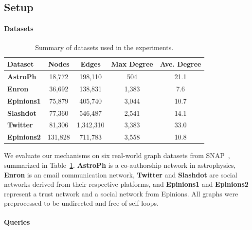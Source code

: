 \subsection{Setup}
\label{subsec:exp_setup}





\paragraph{Datasets}



\begin{table}[!htbp]
\centering
\small
\begin{tabular}{lcccc}
\toprule
\textbf{Dataset} & \textbf{Nodes} & \textbf{Edges} & \textbf{Max Degree} & \textbf{Ave. Degree} \\
\midrule
\textbf{AstroPh}   & 18,772  & 198,110  & 504   & 21.1 \\
\textbf{Enron}     & 36,692  & 138,831  & 1,383 & 7.6  \\
\textbf{Epinions1} & 75,879  & 405,740  & 3,044 & 10.7 \\
\textbf{Slashdot}  & 77,360  & 546,487  & 2,541 & 14.1 \\
\textbf{Twitter}   & 81,306  & 1,342,310 & 3,383 & 33.0 \\
\textbf{Epinions2} & 131,828 & 711,783  & 3,558 & 10.8 \\
\bottomrule
\end{tabular}
\caption{Summary of datasets used in the experiments.}
\label{tab:dataset}
\end{table}


We evaluate our mechanisms on six real-world graph datasets from SNAP~\cite{leskovec2014snap}, summarized in Table~\ref{tab:dataset}. 
\textbf{AstroPh} is a co-authorship network in astrophysics, 
\textbf{Enron} is an email communication network, 
\textbf{Twitter} and \textbf{Slashdot} are social networks derived from their respective platforms, and 
\textbf{Epinions1} and \textbf{Epinions2} represent a trust network and a social network from Epinions. 
All graphs were preprocessed to be undirected and free of self-loops.





\paragraph{Queries}


